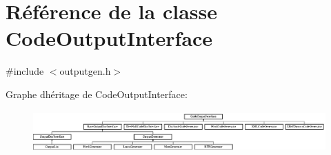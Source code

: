 \hypertarget{class_code_output_interface}{}\section{Référence de la classe Code\+Output\+Interface}
\label{class_code_output_interface}


{\ttfamily \#include $<$outputgen.\+h$>$}

Graphe d\textquotesingle{}héritage de Code\+Output\+Interface\+:\begin{figure}[H]
\begin{center}
\leavevmode
\includegraphics[height=1.590909cm]{class_code_output_interface}
\end{center}
\end{figure}
